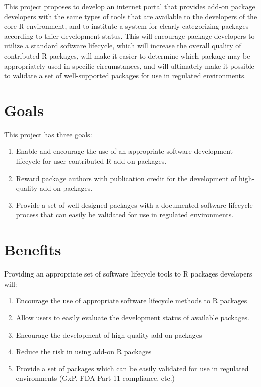 \documentclass[12pt]{article}
\begin{document}
This project proposes to develop an internet portal that provides
add-on package developers with the same types of tools that are
available to the developers of the core R environment, and to
institute a system for clearly categorizing packages according to
thier development status.  This will encourage package developers to
utilize a standard software lifecycle, which will increase the overall
quality of contributed R packages, will make it easier to determine
which package may be appropriately used in specific circumstances, and
will ultimately make it possible to validate a set of well-supported
packages for use in regulated environments.


\section{Goals}

This project has three goals:

\begin{enumerate}
\item Enable and encourage the use of an appropriate software
  development lifecycle for user-contributed R add-on packages.
   
\item Reward package authors with publication credit for the
  development of high-quality add-on packages.
   
\item Provide a set of well-designed packages with a documented
  software lifecycle process that can easily be validated for use in
  regulated environments.

\end{enumerate}

\section{Benefits}

Providing an appropriate set of software lifecycle tools to R packages
developers will:
\begin{enumerate}
\item Encourage the use of appropriate software lifecycle methods to R
  packages
\item Allow users to easily evaluate the development status of
  available packages.
\item Encourage the development of high-quality add on packages
\item Reduce the risk in using add-on R packages
\item Provide a set of packages which can be easily validated for use
  in regulated environments (GxP, FDA Part 11 compliance, etc.)
\end{enumerate}
\end{document}
